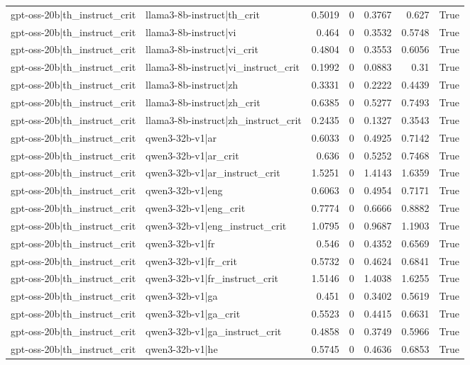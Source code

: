\begin{table}
\begin{tabular}{l l r r r r l}
gpt-oss-20b|th_instruct_crit & llama3-8b-instruct|th_crit & 0.5019 & 0 & 0.3767 & 0.627 & True \\
gpt-oss-20b|th_instruct_crit & llama3-8b-instruct|vi & 0.464 & 0 & 0.3532 & 0.5748 & True \\
gpt-oss-20b|th_instruct_crit & llama3-8b-instruct|vi_crit & 0.4804 & 0 & 0.3553 & 0.6056 & True \\
gpt-oss-20b|th_instruct_crit & llama3-8b-instruct|vi_instruct_crit & 0.1992 & 0 & 0.0883 & 0.31 & True \\
gpt-oss-20b|th_instruct_crit & llama3-8b-instruct|zh & 0.3331 & 0 & 0.2222 & 0.4439 & True \\
gpt-oss-20b|th_instruct_crit & llama3-8b-instruct|zh_crit & 0.6385 & 0 & 0.5277 & 0.7493 & True \\
gpt-oss-20b|th_instruct_crit & llama3-8b-instruct|zh_instruct_crit & 0.2435 & 0 & 0.1327 & 0.3543 & True \\
gpt-oss-20b|th_instruct_crit & qwen3-32b-v1|ar & 0.6033 & 0 & 0.4925 & 0.7142 & True \\
gpt-oss-20b|th_instruct_crit & qwen3-32b-v1|ar_crit & 0.636 & 0 & 0.5252 & 0.7468 & True \\
gpt-oss-20b|th_instruct_crit & qwen3-32b-v1|ar_instruct_crit & 1.5251 & 0 & 1.4143 & 1.6359 & True \\
gpt-oss-20b|th_instruct_crit & qwen3-32b-v1|eng & 0.6063 & 0 & 0.4954 & 0.7171 & True \\
gpt-oss-20b|th_instruct_crit & qwen3-32b-v1|eng_crit & 0.7774 & 0 & 0.6666 & 0.8882 & True \\
gpt-oss-20b|th_instruct_crit & qwen3-32b-v1|eng_instruct_crit & 1.0795 & 0 & 0.9687 & 1.1903 & True \\
gpt-oss-20b|th_instruct_crit & qwen3-32b-v1|fr & 0.546 & 0 & 0.4352 & 0.6569 & True \\
gpt-oss-20b|th_instruct_crit & qwen3-32b-v1|fr_crit & 0.5732 & 0 & 0.4624 & 0.6841 & True \\
gpt-oss-20b|th_instruct_crit & qwen3-32b-v1|fr_instruct_crit & 1.5146 & 0 & 1.4038 & 1.6255 & True \\
gpt-oss-20b|th_instruct_crit & qwen3-32b-v1|ga & 0.451 & 0 & 0.3402 & 0.5619 & True \\
gpt-oss-20b|th_instruct_crit & qwen3-32b-v1|ga_crit & 0.5523 & 0 & 0.4415 & 0.6631 & True \\
gpt-oss-20b|th_instruct_crit & qwen3-32b-v1|ga_instruct_crit & 0.4858 & 0 & 0.3749 & 0.5966 & True \\
gpt-oss-20b|th_instruct_crit & qwen3-32b-v1|he & 0.5745 & 0 & 0.4636 & 0.6853 & True \\

\end{tabular}
\end{table}
